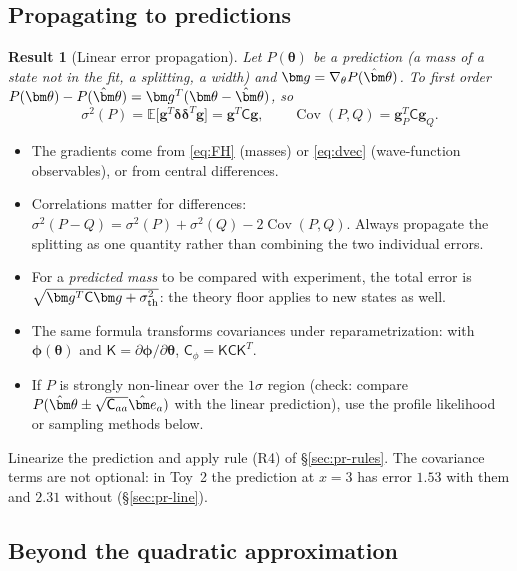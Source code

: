 \documentclass[11pt,a4paper]{article}
\numberwithin{equation}{section}
\theoremstyle{definition}
\theoremstyle{plain}
\newtheorem{result}[definition]{Result}
\theoremstyle{remark}
\newenvironment{plainwords}[1][In plain words]{\begin{tcolorbox}[plainbox,title={\small\bfseries #1},fonttitle=\small,coltitle=white,colbacktitle=ForestGreen!60!black]}{\end{tcolorbox}}
\numberwithin{algorithm}{section}
\newcommand{\sK}{\mathsf K}
\newcommand{\sC}{\mathsf C}
\newcommand{\vth}{\bm\theta}
\newcommand{\vg}{\bm g}
\begin{document}
\subsection{Propagating to predictions}\label{sec:propagate}
\begin{result}[Linear error propagation]
Let $P(\vth)$ be a prediction (a mass of a state not in the fit, a splitting, a width) and $\vg=\nabla_\theta P(\hat\vth)$. To first order $P(\vth)-P(\hat\vth)=\vg^T(\vth-\hat\vth)$, so
\begin{equation}
\sigma^2(P)=\mathbb E\big[\vg^T\bm\delta\bm\delta^T\vg\big]=\vg^T\sC\vg,\qquad
\operatorname{Cov}(P,Q)=\vg_P^T\sC\vg_Q .
\label{eq:prop}
\end{equation}
\end{result}
\begin{itemize}[leftmargin=1.3em,itemsep=2pt]
\item The gradients come from \eqref{eq:FH} (masses) or \eqref{eq:dvec} (wave-function observables), or from central differences.
\item Correlations matter for differences: $\sigma^2(P-Q)=\sigma^2(P)+\sigma^2(Q)-2\operatorname{Cov}(P,Q)$. Always propagate the splitting as one quantity rather than combining the two individual errors.
\item For a \emph{predicted mass} to be compared with experiment, the total error is $\sqrt{\vg^T\sC\vg+\sigma_{\rm th}^2}$: the theory floor applies to new states as well.
\item The same formula transforms covariances under reparametrization: with $\bm\phi(\vth)$ and $\sK=\partial\bm\phi/\partial\vth$, $\sC_\phi=\sK\sC\sK^T$.
\item If $P$ is strongly non-linear over the $1\sigma$ region (check: compare $P(\hat\vth\pm\sqrt{\sC_{aa}}\hat{\bm e}_a)$ with the linear prediction), use the profile likelihood or sampling methods below.
\end{itemize}
\begin{plainwords}[In plain words]
Linearize the prediction and apply rule (R4) of \S\ref{sec:pr-rules}. The covariance terms are not optional: in Toy~2 the prediction at $x=3$ has error $1.53$ with them and $2.31$ without (\S\ref{sec:pr-line}).
\end{plainwords}

\subsection{Beyond the quadratic approximation}\label{sec:beyond}
\end{document}
